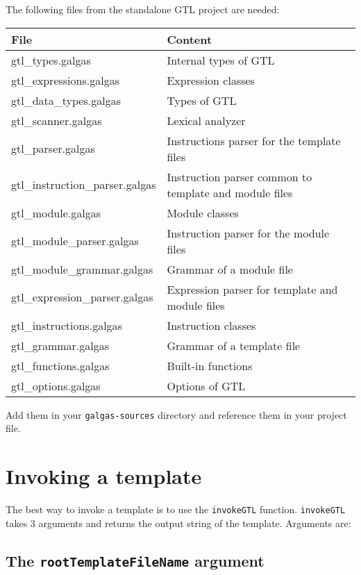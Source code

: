 \documentclass[10pt,openright,twosides,final]{memoir}
\newcommand{\gginline}[1]{\colorbox{light-pink}{\lstinline[language=galgas]{#1}}}
\begin{document}
The following files from the standalone GTL project are needed:
\begin{longtable}{|>{\ttfamily\footnotesize}l|>{\footnotesize}l|}
\hline
{\bfseries File}&{\bfseries Content}\\
\hline\endhead
 {gtl_types.galgas}&
  {Internal types of GTL}\\
 {gtl_expressions.galgas}&
  {Expression classes}\\
 {gtl_data_types.galgas}&
  {Types of GTL}\\
 {gtl_scanner.galgas}&
  {Lexical analyzer}\\
 {gtl_parser.galgas}&
  {Instructions parser for the template files}\\
 {gtl_instruction_parser.galgas}&
  {Instruction parser common to template and module files}\\
 {gtl_module.galgas}&
  {Module classes}\\
 {gtl_module_parser.galgas}&
  {Instruction parser for the module files}\\
 {gtl_module_grammar.galgas}&
  {Grammar of a module file}\\
 {gtl_expression_parser.galgas}&
  {Expression parser for template and module files}\\
 {gtl_instructions.galgas}&
  {Instruction classes}\\
 {gtl_grammar.galgas}&
  {Grammar of a template file}\\
 {gtl_functions.galgas}&
  {Built-in functions}\\
 {gtl_options.galgas}&
  {Options of GTL}\\
\hline
\end{longtable}

Add them in your \texttt{\footnotesize galgas-sources} directory and reference them in your project file.

\section{Invoking a template}

The best way to invoke a template is to use the \gginline{invokeGTL} function. \gginline{invokeGTL} takes 3 arguments and returns the output string of the template. Arguments are:

\subsection{The \texttt{rootTemplateFileName} argument}
\end{document}
